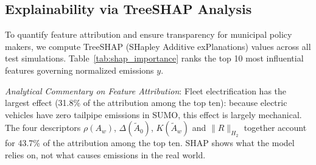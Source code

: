 \documentclass[journal]{IEEEtran}
\begin{document}
\subsection{Explainability via TreeSHAP Analysis}
To quantify feature attribution and ensure transparency for municipal policy makers, we compute TreeSHAP (SHapley Additive exPlanations) values \cite{Lundberg2020} across all test simulations. Table~\ref{tab:shap_importance} ranks the top 10 most influential features governing normalized emissions $y$.

\begin{table}[htbp]
\caption{Top 10 Most Influential Features Ranked by Mean Absolute TreeSHAP Value on Normalized Target $y$}
\label{tab:shap_importance}
\centering
{}
\end{table}

\textit{Analytical Commentary on Feature Attribution}:
Fleet electrification has the largest effect (31.8\% of the attribution among the top ten): because electric vehicles have zero tailpipe emissions in SUMO, this effect is largely mechanical. The four descriptors $\rho(A_w)$, $\Delta(\tilde{A}_0)$, $K(\tilde{A}_w)$ and $\|R\|_{H_2}$ together account for 43.7\% of the attribution among the top ten. SHAP shows what the model relies on, not what causes emissions in the real world.
\end{document}
